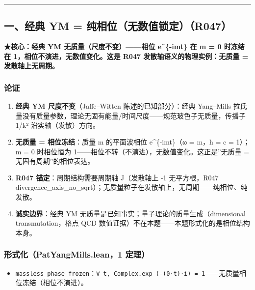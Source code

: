 \documentclass[
]{article}
\providecommand{\tightlist}{%
  \setlength{\itemsep}{0pt}\setlength{\parskip}{0pt}}
\begin{document}
\begin{center}\rule{0.5\linewidth}{0.5pt}\end{center}

\subsection{一、经典 YM =
纯相位（无数值锁定）（R047）}\label{ux4e00ux7ecfux5178-ym-ux7eafux76f8ux4f4dux65e0ux6570ux503cux9501ux5b9ar047}

\textbf{★核心：经典 YM 无质量（尺度不变）------相位 e\^{}\{-imt\} 在 m =
0 时冻结在 1，相位不演进，无数值变化。这是 R047
发散轴语义的物理实例：无质量 = 发散轴上无周期。}

\subsubsection{论证}\label{ux8bbaux8bc1}

\begin{enumerate}
\def\labelenumi{\arabic{enumi}.}
\tightlist
\item
  \textbf{经典 YM 尺度不变}（Jaffe--Witten 陈述的已知部分）：经典
  Yang--Mills
  拉氏量没有质量参数，理论无固有能量/时间尺度------规范玻色子无质量，传播子
  1/k² 沿实轴（发散）方向。
\item
  \textbf{无质量 = 相位冻结}：质量 m 的平面波相位 e\^{}\{-imt\}（ω =
  m，ħ = c = 1）；m = 0 时相位恒为
  1------相位不转（不演进），无数值变化。这正是''无质量 =
  无固有周期''的相位表达。
\item
  \textbf{R047 锚定}：周期结构需要周期轴 J（发散轴上 -1 无平方根，R047
  divergence\_axis\_no\_sqrt）；无质量粒子在发散轴上，无周期------纯相位、纯发散。
\item
  \textbf{诚实边界}：经典 YM
  无质量是已知事实；量子理论的质量生成（dimensional transmutation，格点
  QCD 数值证据）不在本题------本题形式化的是相位结构本身。
\end{enumerate}

\subsubsection{形式化（PatYangMills.lean，1
定理）}\label{ux5f62ux5f0fux5316patyangmills.lean1-ux5b9aux7406}

\begin{itemize}
\tightlist
\item
  \texttt{massless\_phase\_frozen}：\texttt{∀\ t,\ Complex.exp\ (-(0·t)·i)\ =\ 1}------无质量相位冻结（相位不演进）。
\end{itemize}
\end{document}
